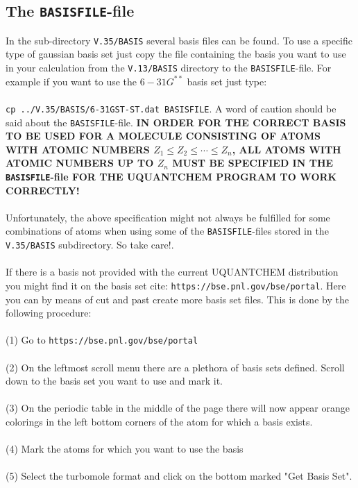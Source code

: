 \documentclass[a4paper,twoside,openany]{book}
\begin{document}
\subsection{The \texttt{BASISFILE}-file}
In the sub-directory \texttt{V.35/BASIS} several basis files can be found. To use a specific type of gaussian basis set just copy the  file containing 
the basis you want to use in your calculation from the \texttt{V.13/BASIS} directory  to the \texttt{BASISFILE}-file. For example if you want to use 
the $6-31G^{**}$ basis set just type: \\ \\
\noindent
\texttt{cp  ../V.35/BASIS/6-31GST-ST.dat   BASISFILE}.
A word of caution should be said about the \texttt{BASISFILE}-file. {\bf IN ORDER FOR THE CORRECT BASIS TO BE USED FOR A MOLECULE CONSISTING
OF ATOMS WITH ATOMIC NUMBERS $Z_{1}\leq Z_{2}\leq \cdots \leq Z_{n}$, ALL ATOMS WITH ATOMIC NUMBERS UP TO  $Z_{n}$ MUST BE SPECIFIED IN 
THE  \texttt{BASISFILE}-file FOR THE UQUANTCHEM PROGRAM TO WORK CORRECTLY!} \\ \\
\noindent
Unfortunately, the above specification might not always be fulfilled for some combinations of atoms when using some of the  \texttt{BASISFILE}-files stored in 
the \texttt{V.35/BASIS} subdirectory. So take care!. \\ \\
\noindent
If there is a basis not provided with the current UQUANTCHEM distribution you might find it on the basis set cite:  \texttt{https://bse.pnl.gov/bse/portal}. Here 
you can by means of cut and past create more basis set files. This is done by the following procedure: \\ \\
(1) Go to  \texttt{https://bse.pnl.gov/bse/portal} \\ \\
(2) On the leftmost scroll menu there are a plethora of basis sets defined. Scroll down to the basis set you want to use and mark it. \\ \\
(3) On the periodic table in the middle of the page there will now appear orange colorings in the left  bottom corners of the atom for which a basis exists. \\ \\
(4) Mark the atoms for which you want to use the basis \\ \\
(5) Select the turbomole format and click on the bottom marked "Get Basis Set". \\ \\
\end{document}

